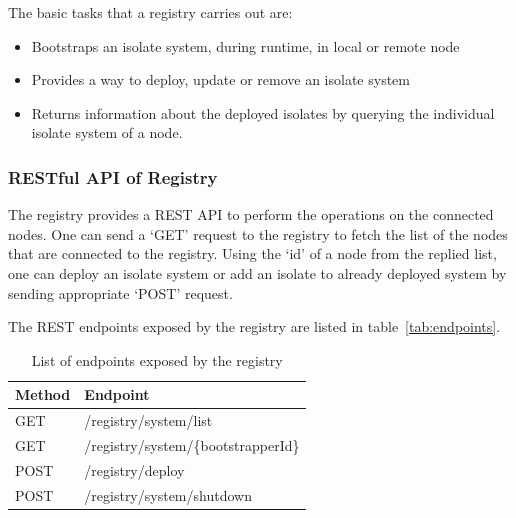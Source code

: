 The basic tasks that a registry carries out are:
\begin{itemize}
  \item Bootstraps an isolate system, during runtime, in local or remote node
  \item Provides a way to deploy, update or remove an isolate system
  \item Returns information about the deployed isolates by querying the individual isolate system of a node.
\end{itemize}

  \subsubsection{RESTful API of Registry}
  \label{subsec:restApi}
  The registry provides a REST API to perform the operations on the connected nodes. One can send a ‘GET’ request to the registry to fetch the list of the nodes that are connected to the registry. Using the ‘id’ of a node from the replied list, one can deploy an isolate system or add an isolate to already deployed system by sending appropriate ‘POST’ request.

  The REST endpoints exposed by the registry are listed in table~\autoref{tab:endpoints}.
  \begin{table}[htsb]
    \caption[endpoints]{List of endpoints exposed by the registry}\label{tab:endpoints}
    \centering
    \begin{tabular}{l l}
      \toprule
        Method  & Endpoint \\
      \midrule
        GET &  /registry/system/list\\
        GET & /registry/system/\{bootstrapperId\} \\
        POST & /registry/deploy \\
        POST & /registry/system/shutdown \\
      \bottomrule
    \end{tabular}
  \end{table}

